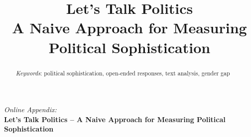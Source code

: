 \documentclass[12pt]{article}
\title{Let's Talk Politics\\
\large{A Naive Approach for Measuring Political Sophistication}%
}
\date{}
\begin{document}
\maketitle
\doublespacing
\thispagestyle{empty}


\hfill
\begin{abstract}\singlespacing
\noindent 


\vspace{\baselineskip}
\noindent \textit{Keywords}: political sophistication, open-ended responses, text analysis, gender gap

\vspace{\baselineskip}
\end{abstract}
\hfill

\newpage\setcounter{page}{1}





\clearpage
\singlespacing
\renewcommand\thesubsection{\Roman{subsection}}
\setcounter{page}{1}
\appendices
\textit{Online Appendix:}\\
\textbf{Let's Talk Politics -- A Naive Approach for Measuring Political Sophistication}

\startcontents[sections]
\clearpage


\end{document}
